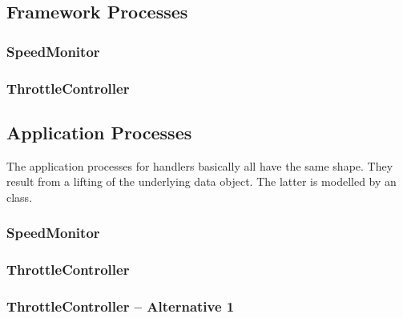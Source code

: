\documentclass{article}
\begin{document}
\subsection{Framework Processes}

\subsubsection{SpeedMonitor}

\begin{circusbox}

\end{circusbox}

\subsubsection{ThrottleController}

\begin{circusbox}

\end{circusbox}

\subsection{Application Processes}

The application processes for handlers basically all have the same shape. They result from a lifting of the underlying data object. The latter is modelled by an {\OhCircus} class.

\subsubsection{SpeedMonitor}

\begin{circusbox}

\end{circusbox}

\subsubsection{ThrottleController}

\begin{circusbox}

\end{circusbox}

\newpage

\subsubsection{ThrottleController -- Alternative 1}
\end{document}
